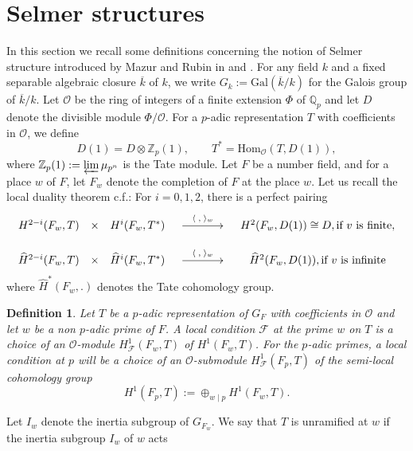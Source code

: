 \documentclass[reqno]{amsart}
\newcounter{dummy} \numberwithin{dummy}{section}
\newtheorem{deft}[dummy]{Definition}
\begin{document}
\section{\bf Selmer structures}
In this section we recall  some definitions concerning the notion of
 Selmer structure introduced by Mazur and Rubin in \cite{MR04} and
 \cite{MR 16}. For any field $k$  and a fixed separable algebraic closure
$\overline{k}$ of $k$, we write
$G_{k}:=\mathrm{Gal}(\overline{k}/k)$ for the Galois group of
$\overline{k}/k$. Let $\mathcal{O}$ be the ring of integers of a
finite extension $\Phi$ of $\mathbb{Q}_{p}$ and  let $D$ denote the
divisible module $\Phi/\mathcal{O}$. For a $p$-adic representation
$T$ with coefficients in $\mathcal{O}$, we  define
$$ D(1)=D\otimes \mathbb{Z}_{p}(1),\quad\quad
T^{\ast}=\mathrm{Hom}_{\mathcal{O}}(T,D(1)),
$$
where $\mathbb{Z}_{p}(1):=\varprojlim \mu_{p^{n}}$ is the Tate
module.\vskip 6pt Let $F$ be a number field, and for a place $w$ of
$F$, let $F_{w}$ denote the completion of $F$ at the  place $w$. Let
us recall the local duality theorem c.f.\cite[Corollary I.2.3
]{Milne}: For $i=0,1,2$, there is a perfect  pairing
\begin{equation}\label{local dualty theorem}
\begin{array}{cccccccc}
  H^{2-i}(F_{w},T) & \times & H^{i}(F_{w},T^{\ast})& \xymatrix@=3pc{\ar[r]^-{\langle\;,\;\rangle_{w}}&} &H^{2}(F_{w},D(1))\cong D,\mbox{if $v$ is finite},\\
 &  &   &  &\\
  \widehat{H}^{2-i} (F_{w},T)& \times & \widehat{H}^{i}(F_{w},T^{\ast}) & \xymatrix@=3pc{\ar[r]^-{\langle\;,\;\rangle_{w}}&} &
\widehat{H}^{2}(F_{w},D(1)),\mbox{if $v$ is infinite}
\end{array}
\end{equation}
where $\widehat{H}^{\ast}(F_{w},.)$ denotes the Tate cohomology
group.\vskip 6pt
\begin{deft} Let $T$ be a $p$-adic representation of $G_{F}$ with
coefficients in $\mathcal{O}$ and let $w$ be a non $p$-adic prime of
$F$. A local condition $\mathcal{F}$ at the prime $w$  on $T$ is a
choice of an $\mathcal{O}$-module $H^{1}_{\mathcal{F}}(F_{w},T)$ of
$H^{1}(F_{w},T)$. For the $p$-adic primes, a local condition at $p$
will be a choice of an $\mathcal{O}$-submodule
$H^{1}_{\mathcal{F}}(F_{p},T)$ of the semi-local cohomology group
$$
H^{1}(F_{p},T):=\oplus_{w\mid p}H^{1}(F_{w},T).
$$
\end{deft}
Let $I_{w}$ denote the inertia subgroup of $G_{F_{w}}$. We say that
$T$ is unramified at $w$ if the inertia subgroup $I_{w}$ of $w$ acts
\end{document}
